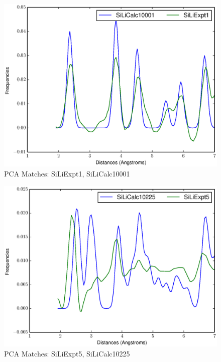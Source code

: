 \documentclass[12pt,letterpaper]{article}
\begin{document}
\begin{figure}[ht]
  \begin{center}
    \includegraphics[scale=0.8]{figs/PCAMatchSiLiExpt1-SiLiCalc10001.eps}
    \caption{PCA Matches: SiLiExpt1, SiLiCalc10001}
  \end{center}
\end{figure}

\begin{figure}[ht]
  \begin{center}
    \includegraphics[scale=0.8]{figs/PCAMatchSiLiExpt5-SiLiCalc10225.eps}
    \caption{PCA Matches: SiLiExpt5, SiLiCalc10225}
  \end{center}
\end{figure}
\clearpage
\end{document}
